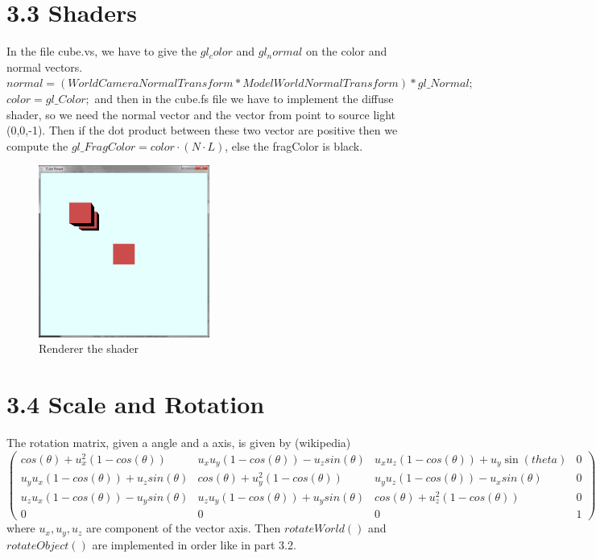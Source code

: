 \documentclass[10pt,a4paper]{report}
\begin{document}
\section*{3.3 Shaders}
In the file cube.vs, we have to give the $gl_color$ and $gl_normal$ on the color and normal vectors. 
$normal = (WorldCameraNormalTransform*ModelWorldNormalTransform)*gl\_Normal;$\\
$color = gl\_Color;$ and then in the cube.fs file we have to implement the diffuse shader, so we need the normal vector and the vector from point to source light (0,0,-1). Then if the dot product between these two vector are positive then we compute the  $gl\_FragColor = color \cdot (N \cdot L)$, else the fragColor is black.
\begin{figure}[h!]
\caption{Renderer the shader}
  \centering
    \includegraphics[width=0.5\textwidth]{3-3.png}
\end{figure}
\section*{3.4  Scale and Rotation}
The rotation matrix, given a angle and a axis, is given by (wikipedia)
\[ \left( \begin{array}{cccc}
cos(\theta)+u_x^2(1-cos(\theta)) & u_x u_y (1-cos(\theta))- u_z sin(\theta) & u_x u_z (1-cos(\theta))+ u_y \sin(theta) & 0\\
u_y u_x (1-cos(\theta)) + u_z sin(\theta) & cos(\theta)+u_y^2(1- cos(\theta)) & u_y u_z(1- cos(\theta)) - u_x sin(\theta) & 0\\
u_z u_x (1-cos(\theta)) -u_y sin(\theta) & u_z u_y (1-cos(\theta))+ u_y sin(\theta) & cos(\theta) + u_z^2(1-cos(\theta)) & 0\\
0 & 0 & 0 & 1\end{array} \right)\] 
where $u_x, u_y, u_z$ are component of the vector axis. Then $rotateWorld()$ and $rotateObject()$ are implemented in order like in part 3.2.
\end{document}
